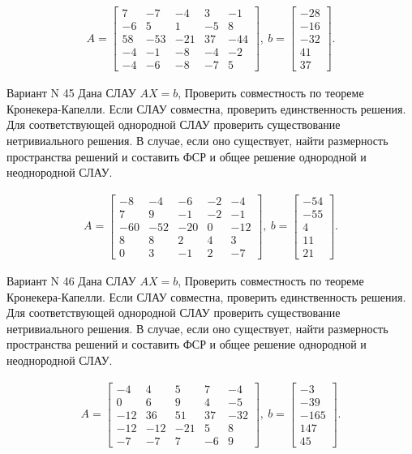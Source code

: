 \documentclass[11pt]{report}
\begin{document}
\begin{align*}
 A = \left[\begin{matrix}7 & -7 & -4 & 3 & -1\\-6 & 5 & 1 & -5 & 8\\58 & -53 & -21 & 37 & -44\\-4 & -1 & -8 & -4 & -2\\-4 & -6 & -8 & -7 & 5\end{matrix}\right],
\ b = \left[\begin{matrix}-28\\-16\\-32\\41\\37\end{matrix}\right]. 
 \end{align*}

Вариант N 45
Дана СЛАУ $AX = b$,
Проверить совместность по теореме Кронекера-Капелли. Если СЛАУ совместна, проверить единственность решения.
Для соответствующей однородной СЛАУ проверить существование нетривиального решения. В случае, если оно существует,
найти размерность пространства решений и составить ФСР и общее решение однородной  и неоднородной СЛАУ.


\begin{align*}
 A = \left[\begin{matrix}-8 & -4 & -6 & -2 & -4\\7 & 9 & -1 & -2 & -1\\-60 & -52 & -20 & 0 & -12\\8 & 8 & 2 & 4 & 3\\0 & 3 & -1 & 2 & -7\end{matrix}\right],
\ b = \left[\begin{matrix}-54\\-55\\4\\11\\21\end{matrix}\right]. 
 \end{align*}

Вариант N 46
Дана СЛАУ $AX = b$,
Проверить совместность по теореме Кронекера-Капелли. Если СЛАУ совместна, проверить единственность решения.
Для соответствующей однородной СЛАУ проверить существование нетривиального решения. В случае, если оно существует,
найти размерность пространства решений и составить ФСР и общее решение однородной  и неоднородной СЛАУ.


\begin{align*}
 A = \left[\begin{matrix}-4 & 4 & 5 & 7 & -4\\0 & 6 & 9 & 4 & -5\\-12 & 36 & 51 & 37 & -32\\-12 & -12 & -21 & 5 & 8\\-7 & -7 & 7 & -6 & 9\end{matrix}\right],
\ b = \left[\begin{matrix}-3\\-39\\-165\\147\\45\end{matrix}\right]. 
 \end{align*}
\end{document}
